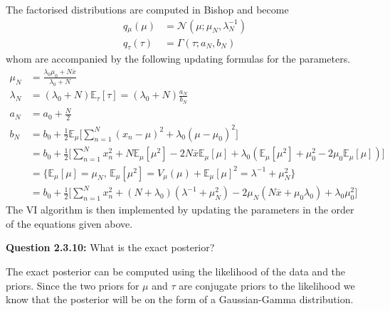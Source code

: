 The factorised distributions are computed in Bishop and become
\begin{align*}
  q{_\mu}(\mu) & = \mathcal{N}(\mu;\mu_N, \lambda_N^{-1}) \\
  q_{\tau}(\tau) & = \Gamma(\tau; a_N, b_N)
\end{align*}
whom are accompanied by the following updating formulas for the parameters. 
\begin{align}
  \mu_N & = \frac{\lambda_0 \mu_0 + N \overline{x}}{\lambda_0 + N}\\
  \lambda_N & = (\lambda_0 + N)\mathbb{E}_{\tau}[\tau] = (\lambda_0 + N) \frac{a_N}{b_N}\\
  a_N & = a_0 + \frac{N}{2} \\
  b_N & = b_0 + \frac{1}{2} \mathbb{E}_{\mu}\Bigg[ \sum_{n=1}^N (x_n - \mu)^2 + \lambda_0 (\mu - \mu_0)^2 \Bigg] \nonumber\\
  & = b_0 + \frac{1}{2} \Bigg[ \sum_{n=1}^N x_n^2 + N \mathbb{E}_{\mu}[\mu^2] - 2N\overline{x}\mathbb{E}_{\mu}[\mu]
          + \lambda_0(\mathbb{E}_{\mu}[\mu^2] + \mu_0^2 - 2\mu_0 \mathbb{E}_{\mu}[\mu]) \Bigg] \nonumber \\
  & = \bigg \{ \mathbb{E}_{\mu}[\mu] = \mu_N , \, \mathbb{E}_{\mu}[\mu^2] = V_{\mu}(\mu) + \mathbb{E}_{\mu}[\mu]^2 = \lambda^{-1} + \mu_N^2 \bigg \} \nonumber \\
  & = b_0 + \frac{1}{2} \Bigg[ \sum_{n=1}^N x_n^2 + (N + \lambda_0)(\lambda^{-1} + \mu_N^2) - 2\mu_N(N\overline{x} + \mu_0 \lambda_0)
          + \lambda_0 \mu_0^2 \Bigg]
\end{align}
The VI algorithm is then implemented by updating the parameters in the order of the equations given above.

\begin{tcolorbox}
\textbf{Question 2.3.10:}
What is the exact posterior?
\end{tcolorbox}
The exact posterior can be computed using the likelihood of the data and the priors. Since the two priors for $\mu$ and $\tau$ are conjugate priors to the likelihood we know that the posterior will be on the form of a Gaussian-Gamma distribution.

